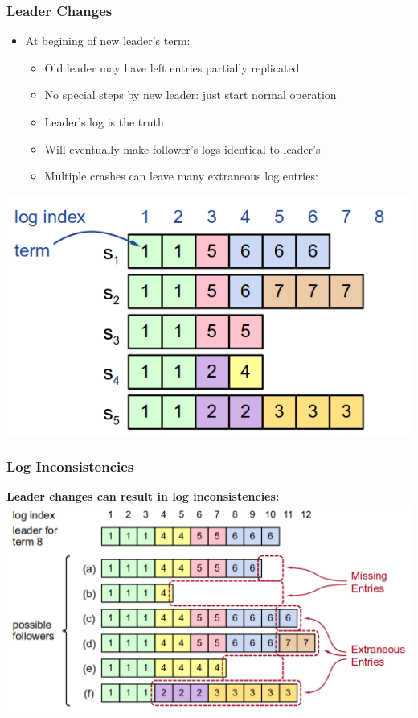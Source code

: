 \begin{frame}
    \frametitle{Leader Changes}
    \begin{itemize}
        \item At begining of new leader's term:
            \begin{itemize}
                \item Old leader may have left entries partially replicated
                \item No special steps by new leader: just start normal operation
                \item Leader's log is \alert{the truth}
                \item Will eventually make follower's logs identical to leader's
                \item Multiple crashes can leave many extraneous log entries:
            \end{itemize}
    \end{itemize}
    \includegraphics[scale=0.3]{./figures/raft-leader-changes.png}
\end{frame}

\begin{frame}
    \frametitle{Log Inconsistencies}
    \textbf{Leader changes can result in log inconsistencies:}
    \includegraphics[scale=0.3]{./figures/raft-log-inconsistency.png}
\end{frame}

